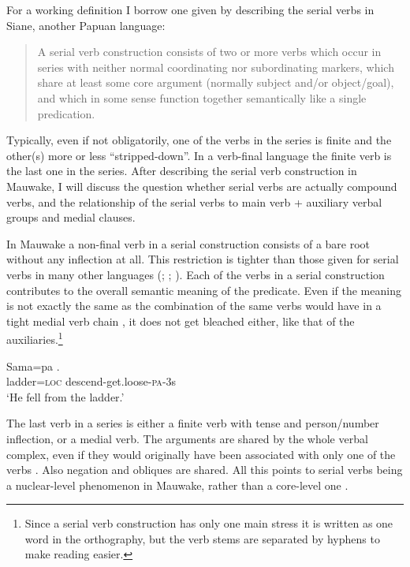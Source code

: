 For a working definition I borrow one given by \citet[28]{James1983} describing the serial verbs in Siane, another Papuan language: 
\begin{quote}
A serial verb construction consists of two or more verbs which occur in series with neither normal coordinating nor subordinating markers, which share at least some core argument (normally subject and/or object/goal), and which in some sense function together semantically like a single predication.
\end{quote}

Typically, even if not obligatorily, one of the verbs in the series is finite and the other(s) more or less ``stripped-down''. In a verb-final language the finite verb is the last one in the series. After describing the serial verb construction in Mauwake, I will discuss the question whether serial verbs are actually compound verbs, and the relationship of the serial verbs to main verb + auxiliary verbal groups and medial clauses.

In Mauwake a non-final verb in a serial construction consists of a bare root without any inflection at all. This restriction is tighter than those given for serial verbs in many other languages (\citealt[19]{Crowley2002}; \citealt[86--87]{Sebba1987}; \citealt[28]{James1983}). Each of the verbs in a serial construction contributes to the overall semantic meaning of the predicate. Even if the meaning is not exactly the same as the combination of the same verbs would have in a tight medial verb chain   \citep[cf.][310]{Payne1997}, it does not get bleached either, like that of the auxiliaries.\footnote{Since a serial verb construction has only one main stress it is written as one word in the orthography, but the verb stems are separated by hyphens to make reading easier.}

\ea%
\label{ex:3:x377}
\gll Sama=pa . \\
ladder=\textsc{loc} descend-get.loose-\textsc{pa}-3s\\
\glt`He fell from the ladder.'
\z

The last verb in a series is either a finite verb with tense and person/number inflection, or a medial verb. The arguments are shared by the whole verbal complex, even if they would originally have been associated with only one of the verbs . Also negation and obliques  are shared. All this points to serial verbs being a nuclear-level phenomenon in Mauwake, rather than a core-level one \citep[189--193]{FoleyEtAl1984}. 

